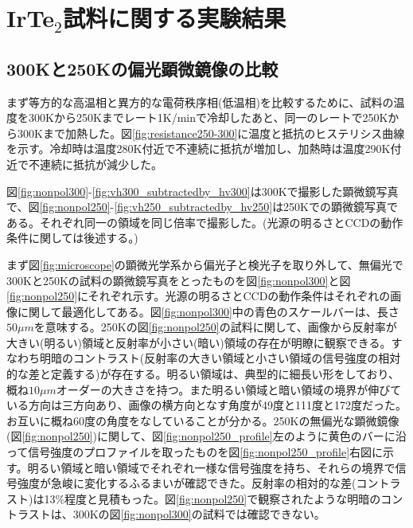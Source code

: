 \section{IrTe$_2$試料に関する実験結果}
\subsection{300Kと250Kの偏光顕微鏡像の比較}
まず等方的な高温相と異方的な電荷秩序相(低温相)を比較するために、試料の温度を300Kから250Kまでレート1K/minで冷却したあと、同一のレートで250Kから300Kまで加熱した。図\ref{fig:resistance250-300}に温度と抵抗のヒステリシス曲線を示す。冷却時は温度280K付近で不連続に抵抗が増加し、加熱時は温度290K付近で不連続に抵抗が減少した。

図\ref{fig:nonpol300}-\ref{fig:vh300_subtractedby_hv300}は300Kで撮影した顕微鏡写真で、図\ref{fig:nonpol250}-\ref{fig:vh250_subtractedby_hv250}は250Kでの顕微鏡写真である。それぞれ同一の領域を同じ倍率で撮影した。(光源の明るさとCCDの動作条件に関しては後述する。)

まず図\ref{fig:microscope}の顕微光学系から偏光子と検光子を取り外して、無偏光で300Kと250Kの試料の顕微鏡写真をとったものを図\ref{fig:nonpol300}と図\ref{fig:nonpol250}にそれぞれ示す。光源の明るさとCCDの動作条件はそれぞれの画像に関して最適化してある。図\ref{fig:nonpol300}中の青色のスケールバーは、長さ$50 \mu m$を意味する。250Kの図\ref{fig:nonpol250}の試料に関して、画像から反射率が大きい(明るい)領域と反射率が小さい(暗い)領域の存在が明瞭に観察できる。すなわち明暗のコントラスト(反射率の大きい領域と小さい領域の信号強度の相対的な差と定義する)が存在する。明るい領域は、典型的に細長い形をしており、概ね$10 \mu m$オーダーの大きさを持つ。また明るい領域と暗い領域の境界が伸びている方向は三方向あり、画像の横方向となす角度が49度と111度と172度だった。お互いに概ね60度の角度をなしていることが分かる。250Kの無偏光な顕微鏡像(図\ref{fig:nonpol250})に関して、図\ref{fig:nonpol250_profile}左のように黄色のバーに沿って信号強度のプロファイルを取ったものを図\ref{fig:nonpol250_profile}右図に示す。明るい領域と暗い領域でそれぞれ一様な信号強度を持ち、それらの境界で信号強度が急峻に変化するふるまいが確認できた。反射率の相対的な差(コントラスト)は13\%程度と見積もった。図\ref{fig:nonpol250}で観察されたような明暗のコントラストは、300Kの図\ref{fig:nonpol300}の試料では確認できない。

